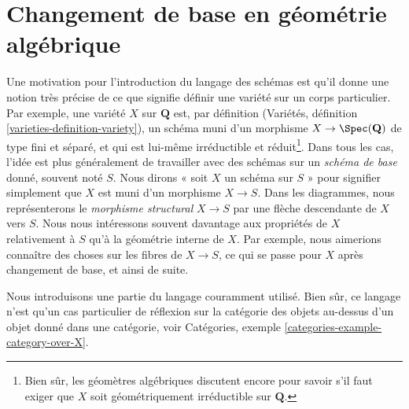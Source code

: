 \section{Changement de base en géométrie algébrique}
\label{section-base-change}

\noindent
Une motivation pour l'introduction du langage des schémas est qu'il
donne une notion très précise de ce que signifie définir une variété
sur un corps particulier. Par exemple, une variété $X$ sur $\mathbf{Q}$
est, par définition (Variétés,
définition \ref{varieties-definition-variety}), un schéma muni d'un
morphisme $X \to \Spec(\mathbf{Q})$ de type fini et séparé,
et qui est lui-même irréductible et réduit\footnote{Bien sûr, les géomètres
algébriques discutent encore pour savoir s'il faut exiger que $X$
soit géométriquement irréductible sur $\mathbf{Q}$.}. Dans tous les cas, l'idée
est plus généralement de travailler avec des schémas sur un {\it schéma de
base} donné, souvent noté $S$. Nous dirons « soit $X$ un schéma sur $S$ » pour
signifier simplement que $X$ est muni d'un morphisme $X \to S$. Dans les
diagrammes, nous représenterons le {\it morphisme structural} $X \to S$
par une flèche descendante de $X$ vers $S$. Nous
nous intéressons souvent davantage aux propriétés de $X$ relativement
à $S$ qu'à la géométrie interne de $X$. Par exemple,
nous aimerions connaître des choses sur les fibres de $X \to S$, ce qui se passe
pour $X$ après changement de base, et ainsi de suite.

\medskip\noindent
Nous introduisons une partie du langage couramment utilisé. Bien
sûr, ce langage n'est qu'un cas particulier de réflexion sur
la catégorie des objets au-dessus d'un objet donné dans une catégorie,
voir Catégories, exemple \ref{categories-example-category-over-X}.


